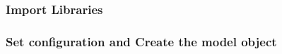 \documentclass[letterpaper,10pt,english,openany,oneside]{sphinxmanual}
\begin{document}
\subsubsection{Import Libraries}
\label{\detokenize{examples/01_Example_QP:import-libraries}}
\begin{sphinxVerbatim}[commandchars=\\\{\}]
 
\end{sphinxVerbatim}


\subsubsection{Set configuration and Create the model object}
\label{\detokenize{examples/01_Example_QP:set-configuration-and-create-the-model-object}}
\end{document}
